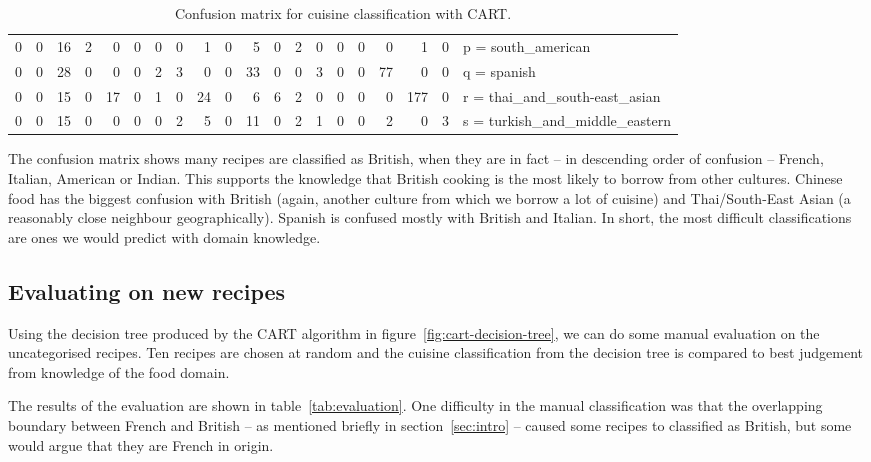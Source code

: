\documentclass[11pt,a4paper]{article}
\begin{document}
\begin{sidewaystable}
\begin{tabular}{r r r r r r r r r r r r r r r r r r r | l}
    0&   0&  16&   2&   0&   0&   0&   0&   1&   0&   5&   0&   2&   0&   0&   0&   0&   1&   0& p = south\_american \\
    0&   0&  28&   0&   0&   0&   2&   3&   0&   0&  33&   0&   0&   3&   0&   0&  77&   0&   0& q = spanish \\
    0&   0&  15&   0&  17&   0&   1&   0&  24&   0&   6&   6&   2&   0&   0&   0&   0& 177&   0& r = thai\_and\_south-east\_asian \\
    0&   0&  15&   0&   0&   0&   0&   2&   5&   0&  11&   0&   2&   1&   0&   0&   2&   0&   3& s = turkish\_and\_middle\_eastern \\
  \end{tabular}
  \caption{Confusion matrix for cuisine classification with CART.}
  \label{tab:confusion}
\end{sidewaystable}

The confusion matrix shows many recipes are classified as British, when they are in
fact -- in descending order of confusion -- French, Italian, American or Indian. This
supports the knowledge that British cooking is the most likely to borrow
from other cultures. Chinese food has the biggest confusion with British (again,
another culture from which we borrow a lot of cuisine) and Thai/South-East Asian (a
reasonably close neighbour geographically). Spanish is confused mostly with British
and Italian. In short, the most difficult classifications are ones we would predict
with domain knowledge.

\subsection{Evaluating on new recipes}

Using the decision tree produced by the CART algorithm in figure~\ref{fig:cart-decision-tree},
we can do some manual evaluation on the uncategorised recipes. Ten recipes are chosen
at random and the cuisine classification from the decision tree is compared to best
judgement from knowledge of the food domain.

The results of the evaluation are shown in table~\ref{tab:evaluation}. One difficulty
in the manual classification was that the overlapping boundary between French and British -- as
mentioned briefly in section~\ref{sec:intro} -- caused some recipes to classified
as British, but some would argue that they are French in origin.
\end{document}
